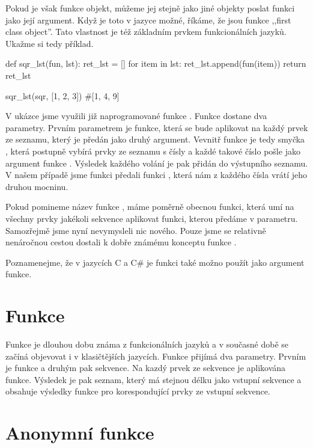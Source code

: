 Pokud je však funkce objekt, můžeme jej stejně jako jiné objekty poslat funkci jako její argument.
Když je toto v jazyce možné, říkáme, že jsou funkce ,,first class object''. Tato vlastnost
je též základním prvkem funkcionálních jazyků. Ukažme si tedy příklad.

\begin{python}
def sqr_lst(fun, lst):
    ret_lst = []
    for item in lst:
        ret_lst.append(fun(item))
    return ret_lst

sqr_lst(sqr, [1, 2, 3])
#[1, 4, 9]
\end{python}

V ukázce jsme využili již naprogramované funkce . Funkce 
dostane dva parametry. Prvním parametrem je funkce, která se bude aplikovat na každý prvek ze seznamu,
který je předán jako druhý argument. Vevnitř funkce je tedy smyčka , která postupně
vybírá prvky ze seznamu s čísly a každé takové číslo pošle jako argument funkce . Výsledek každého volání je pak přidán do výstupního seznamu. V našem případě jsme funkci  předali
funkci , která nám z každého čísla vrátí jeho druhou mocninu. 

Pokud pomineme název funkce , máme poměrně obecnou funkci, která umí na všechny
prvky jakékoli sekvence aplikovat funkci, kterou předáme v parametru. Samozřejmě jsme
nyní nevymysleli nic nového. Pouze jsme se relativně nenáročnou cestou dostali k dobře známému
konceptu funkce .

Poznamenejme, že v jazycích C a C\# je funkci také možno použít jako argument funkce.

\section{Funkce }

Funkce  je dlouhou dobu známa z funkcionálních jazyků a v současné době se začíná objevovat
i v klasičtějších jazycích. Funkce přijímá dva parametry. Prvním je funkce a druhým pak sekvence.
Na kazdý prvek ze sekvence je aplikována funkce. Výsledek je pak seznam, který má stejnou délku
jako vstupní sekvence a obsahuje výsledky funkce pro korespondující prvky ze vstupní sekvence.

\section{Anonymní funkce}

